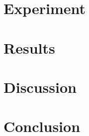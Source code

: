 \documentclass[11pt]{article}
\begin{document}
\section{Experiment}

\section{Results}

\section{Discussion}

\section{Conclusion}



\appendix
\end{document}
